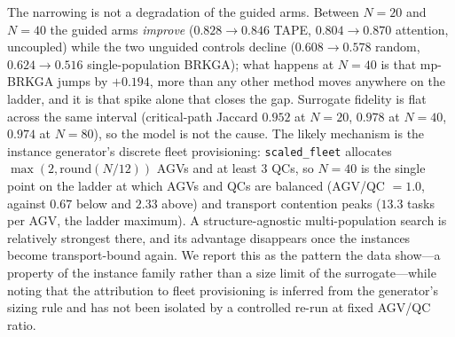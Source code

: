 \documentclass[11pt]{article}
\begin{document}
The narrowing is not a degradation of the guided arms. Between $N{=}20$ and $N{=}40$ the
guided arms \emph{improve} ($0.828\!\to\!0.846$ TAPE, $0.804\!\to\!0.870$ attention,
uncoupled) while the two unguided controls decline ($0.608\!\to\!0.578$ random,
$0.624\!\to\!0.516$ single-population BRKGA); what happens at $N{=}40$ is that mp-BRKGA
jumps by $+0.194$, more than any other method moves anywhere on the ladder, and it is that
spike alone that closes the gap. Surrogate fidelity is flat across the same interval
(critical-path Jaccard $0.952$ at $N{=}20$, $0.978$ at $N{=}40$, $0.974$ at $N{=}80$), so
the model is not the cause. The likely mechanism is the instance generator's discrete fleet
provisioning: \texttt{scaled\_fleet} allocates $\max(2,\mathrm{round}(N/12))$ AGVs and at
least $3$ QCs, so $N{=}40$ is the single point on the ladder at which AGVs and QCs are
balanced (AGV/QC $=1.0$, against $0.67$ below and $2.33$ above) and transport contention
peaks ($13.3$ tasks per AGV, the ladder maximum). A structure-agnostic multi-population
search is relatively strongest there, and its advantage disappears once the instances become
transport-bound again. We report this as the pattern the data show---a property of the
instance family rather than a size limit of the surrogate---while noting that the
attribution to fleet provisioning is inferred from the generator's sizing rule and has not
been isolated by a controlled re-run at fixed AGV/QC ratio.
\end{document}
